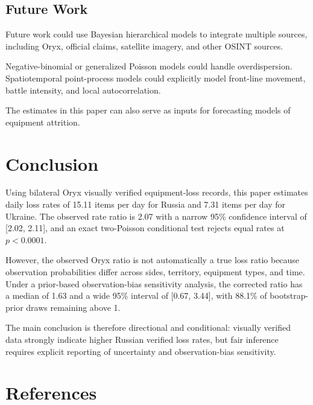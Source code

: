 \documentclass[a4paper,11pt]{article}
\begin{document}
\subsection{Future Work}

Future work could use Bayesian hierarchical models to integrate multiple sources, including Oryx, official claims, satellite imagery, and other OSINT sources.

Negative-binomial or generalized Poisson models could handle overdispersion. Spatiotemporal point-process models could explicitly model front-line movement, battle intensity, and local autocorrelation.

The estimates in this paper can also serve as inputs for forecasting models of equipment attrition.

\section{Conclusion}

Using bilateral Oryx visually verified equipment-loss records, this paper estimates daily loss rates of 15.11 items per day for Russia and 7.31 items per day for Ukraine. The observed rate ratio is 2.07 with a narrow 95\% confidence interval of [2.02, 2.11], and an exact two-Poisson conditional test rejects equal rates at $p<0.0001$.

However, the observed Oryx ratio is not automatically a true loss ratio because observation probabilities differ across sides, territory, equipment types, and time. Under a prior-based observation-bias sensitivity analysis, the corrected ratio has a median of 1.63 and a wide 95\% interval of [0.67, 3.44], with 88.1\% of bootstrap-prior draws remaining above 1.

The main conclusion is therefore directional and conditional: visually verified data strongly indicate higher Russian verified loss rates, but fair inference requires explicit reporting of uncertainty and observation-bias sensitivity.

\section*{References}
\end{document}
